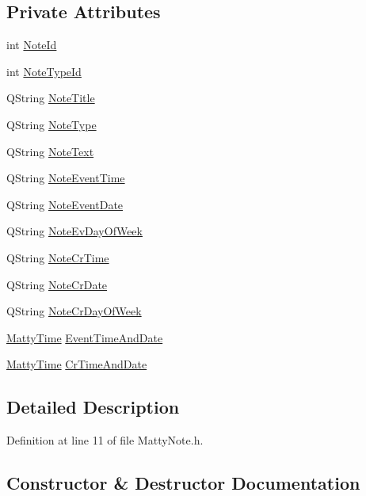 \subsection*{Private Attributes}
\begin{DoxyCompactItemize}
\item 
int \hyperlink{classMattyNote_a15a3c21ef00e8c629aeb58025121b0a9}{Note\+Id}
\item 
int \hyperlink{classMattyNote_ad116cdf301951c8c93ee2a81a0df8647}{Note\+Type\+Id}
\item 
Q\+String \hyperlink{classMattyNote_a185f1f13eeb93acb237b9db7b4c94229}{Note\+Title}
\item 
Q\+String \hyperlink{classMattyNote_a0b45b382884fac5b651ab1ce155a2c13}{Note\+Type}
\item 
Q\+String \hyperlink{classMattyNote_ab54fa825ed3ce8081befdb0c391d682b}{Note\+Text}
\item 
Q\+String \hyperlink{classMattyNote_a3e69ae7fb7c8c616594a9647c14a192e}{Note\+Event\+Time}
\item 
Q\+String \hyperlink{classMattyNote_a9644cd6552e27c1875d83edce2469db3}{Note\+Event\+Date}
\item 
Q\+String \hyperlink{classMattyNote_a1182beac3edac3a7a7e4cdce72fc02ce}{Note\+Ev\+Day\+Of\+Week}
\item 
Q\+String \hyperlink{classMattyNote_a03208145949dfb98a99cfd9d95373418}{Note\+Cr\+Time}
\item 
Q\+String \hyperlink{classMattyNote_a3b94a4b062d2c2335f410f252210ed20}{Note\+Cr\+Date}
\item 
Q\+String \hyperlink{classMattyNote_a3776d088e67ef0181116b1cc2db3fd94}{Note\+Cr\+Day\+Of\+Week}
\item 
\hyperlink{classMattyTime}{Matty\+Time} \hyperlink{classMattyNote_a1f870bad84b62162b8ee07bff70e3003}{Event\+Time\+And\+Date}
\item 
\hyperlink{classMattyTime}{Matty\+Time} \hyperlink{classMattyNote_ae2959e86661be06281c70a5b87390587}{Cr\+Time\+And\+Date}
\end{DoxyCompactItemize}


\subsection{Detailed Description}


Definition at line 11 of file Matty\+Note.\+h.



\subsection{Constructor \& Destructor Documentation}
\hypertarget{classMattyNote_a8c09bf366e6973bc1c4f4d5daa792899}{}\label{classMattyNote_a8c09bf366e6973bc1c4f4d5daa792899} 
